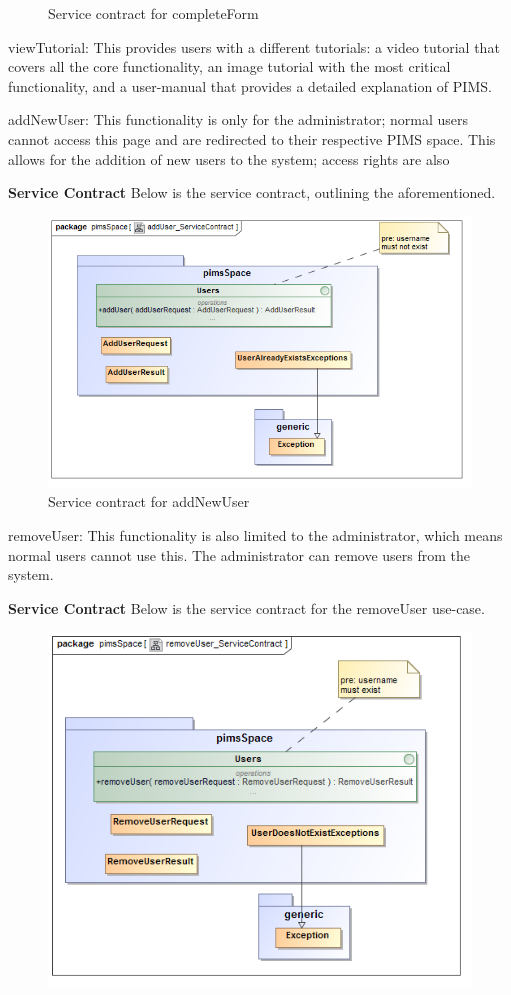 \begin{description}
\begin{description}
\begin{figure}[H]
			\caption{Service contract for completeForm}
		\end{figure}
	\end{description} 
	\item{viewTutorial:} This provides users with a different tutorials: a video tutorial that covers all the core functionality, an image tutorial with the most critical functionality, and a user-manual that provides a detailed explanation of PIMS.
	\item{addNewUser:} This functionality is only for the administrator; normal users cannot access this page and are redirected to their respective PIMS space. This allows for the addition of new users to the system; access rights are also
			\begin{description}
		\item{\textbf{Service Contract}} Below is the service contract, outlining the aforementioned.
		\begin{figure}[H]
			\centerline{\includegraphics[width=0.7\linewidth]{./Functional_Requirements/Graphics/pimsSpace/addUser_ServiceContract}}
			\caption{Service contract for addNewUser}
		\end{figure}
	\end{description} 
	\item{removeUser:} This functionality is also limited to the administrator, which means normal users cannot use this. The administrator can remove users from the system.
			\begin{description}
		\item{\textbf{Service Contract}} Below is the service contract for the removeUser use-case.
		\begin{figure}[H]
			\centerline{\includegraphics[width=0.7\linewidth]{./Functional_Requirements/Graphics/pimsSpace/removeUser_ServiceContract}}

\end{figure}
\end{description}
\end{description}
